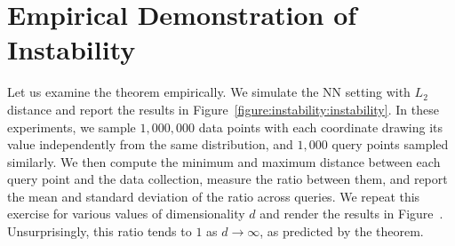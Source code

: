 \section{Empirical Demonstration of Instability}

Let us examine the theorem empirically.
We simulate the NN setting with $L_2$ distance and report the results in Figure~\ref{figure:instability:instability}.
In these experiments, we sample $1{,}000{,}000$ data points with each coordinate drawing its value independently
from the same distribution, and $1{,}000$ query points sampled similarly. We then compute the minimum and maximum distance
between each query point and the data collection, measure the ratio between them, and report the mean
and standard deviation of the ratio across queries. We repeat this exercise for various values of dimensionality $d$
and render the results in Figure~. Unsurprisingly, this ratio tends
to $1$ as $d \rightarrow \infty$, as predicted by the theorem.

